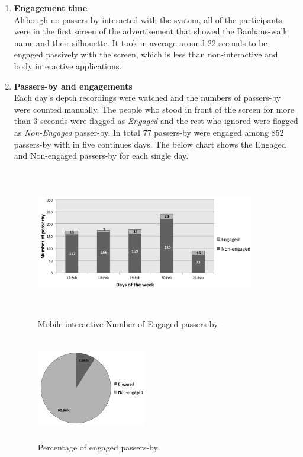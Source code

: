 \begin{enumerate}
\newpage
\item \textbf{Engagement time} \\
Although no passers-by interacted with the system, all of the participants were in the first screen of the advertisement that showed the Bauhaus-walk name and their silhouette. It took in average around 22 seconds to be engaged passively with the screen, which is less than non-interactive and body interactive applications. 


\item \textbf{Passers-by and engagements} \\
Each day’s depth recordings were watched and the numbers of passers-by were counted manually. The people who stood in front of the screen for more than 3 seconds were flagged as \emph{Engaged} and the rest who ignored were flagged as \emph{Non-Engaged} passer-by. In total 77 passers-by were engaged among 852 passers-by with in five continues days. The below chart shows the Engaged and Non-engaged passers-by for each single day.
\begin{figure}[H]
    \centering
    \includegraphics[width=0.9\textwidth,height=6.5cm]{Figures/8/mobile_inter_findings/mobile_inter_engage_day}
    \caption{Mobile interactive Number of Engaged passers-by}%
    \label{fig:mobileengagedandengagedby}%
\end{figure}


\begin{figure}[H]
    \centering
    \includegraphics[width=0.45\textwidth,height=4.5cm]{Figures/8/mobile_inter_findings/mobile_eng_percentage}
    \caption{Percentage of engaged passers-by}%
    \label{fig:mobileengagedpasserbypercentage}%
\end{figure}


\end{enumerate}
